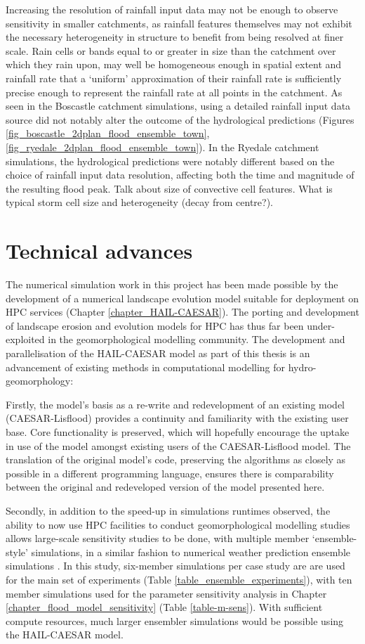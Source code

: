 Increasing the resolution of rainfall input data may not be enough to observe sensitivity in smaller catchments, as rainfall features themselves may not exhibit the necessary heterogeneity in structure to benefit from being resolved at finer scale. Rain cells or bands equal to or greater in size than the catchment over which they rain upon, may well be homogeneous enough in spatial extent and rainfall rate that a `uniform' approximation of their rainfall rate is sufficiently precise enough to represent the rainfall rate at all points in the catchment. As seen in the Boscastle catchment simulations, using a detailed rainfall input data source did not notably alter the outcome of the hydrological predictions (Figures \ref{fig_boscastle_2dplan_flood_ensemble_town}, \ref{fig_ryedale_2dplan_flood_ensemble_town}). In the Ryedale catchment simulations, the hydrological predictions were notably different based on the choice of rainfall input data resolution, affecting both the time and magnitude of the resulting flood peak. 
%
Talk about size of convective cell features. What is typical storm cell size and heterogeneity (decay from centre?).

\section{Technical advances}
The numerical simulation work in this project has been made possible by the development of a numerical landscape evolution model suitable for deployment on HPC services (Chapter \ref{chapter_HAIL-CAESAR}). The porting and development of landscape erosion and evolution models for HPC has thus far been under-exploited in the geomorphological modelling community. The development and parallelisation of the HAIL-CAESAR model as part of this thesis is an advancement of existing methods in computational modelling for hydro-geomorphology:

Firstly, the model's basis as a re-write and redevelopment of an existing model (CAESAR-Lisflood) provides a continuity and familiarity with the existing user base. Core functionality is preserved, which will hopefully encourage the uptake in use of the model amongst existing users of the CAESAR-Lisflood model. The translation of the original model's code, preserving the algorithms as closely as possible in a different programming language, ensures there is comparability between the original and redeveloped version of the model presented here. 

Secondly, in addition to the speed-up in simulations runtimes observed, the ability to now use HPC facilities to conduct geomorphological modelling studies allows large-scale sensitivity studies to be done, with multiple member `ensemble-style' simulations, in a similar fashion to numerical weather prediction ensemble simulations \citep{sivillo1997ensemble,klein2015variability}. In this study, six-member simulations per case study are are used for the main set of experiments (Table \ref{table_ensemble_experiments}), with ten member simulations used for the parameter sensitivity analysis in Chapter \ref{chapter_flood_model_sensitivity} (Table \ref{table-m-sens}). With sufficient compute resources, much larger ensembler simulations would be possible using the HAIL-CAESAR model.

